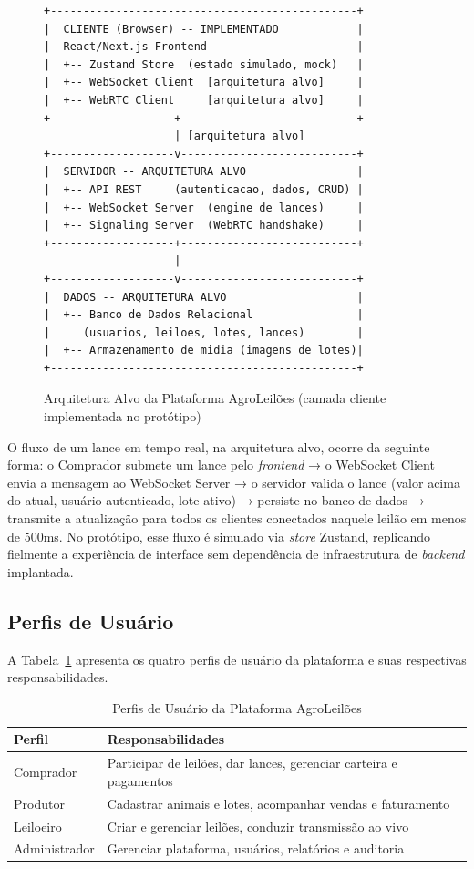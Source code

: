 \documentclass[12pt]{article}
\begin{document}
\begin{figure}[h]
\centering
\begin{lstlisting}
+-----------------------------------------------+
|  CLIENTE (Browser) -- IMPLEMENTADO            |
|  React/Next.js Frontend                       |
|  +-- Zustand Store  (estado simulado, mock)   |
|  +-- WebSocket Client  [arquitetura alvo]     |
|  +-- WebRTC Client     [arquitetura alvo]     |
+-------------------+---------------------------+
                    | [arquitetura alvo]
+-------------------v---------------------------+
|  SERVIDOR -- ARQUITETURA ALVO                 |
|  +-- API REST     (autenticacao, dados, CRUD) |
|  +-- WebSocket Server  (engine de lances)     |
|  +-- Signaling Server  (WebRTC handshake)     |
+-------------------+---------------------------+
                    |
+-------------------v---------------------------+
|  DADOS -- ARQUITETURA ALVO                    |
|  +-- Banco de Dados Relacional                |
|     (usuarios, leiloes, lotes, lances)        |
|  +-- Armazenamento de midia (imagens de lotes)|
+-----------------------------------------------+
\end{lstlisting}
\caption{Arquitetura Alvo da Plataforma AgroLeilões (camada cliente implementada no protótipo)}
\label{fig:arquitetura}
\end{figure}

O fluxo de um lance em tempo real, na arquitetura alvo, ocorre da seguinte forma: o
Comprador submete um lance pelo \textit{frontend} → o WebSocket Client envia a mensagem
ao WebSocket Server → o servidor valida o lance (valor acima do atual, usuário
autenticado, lote ativo) → persiste no banco de dados → transmite a atualização para
todos os clientes conectados naquele leilão em menos de 500ms. No protótipo, esse fluxo
é simulado via \textit{store} Zustand, replicando fielmente a experiência de interface
sem dependência de infraestrutura de \textit{backend} implantada.

\subsection{Perfis de Usuário}

A Tabela~\ref{tab:perfis} apresenta os quatro perfis de usuário da plataforma e suas
respectivas responsabilidades.

\begin{table}[h]
\centering
\caption{Perfis de Usuário da Plataforma AgroLeilões}
\label{tab:perfis}
\begin{tabularx}{\columnwidth}{lX}
\toprule
\textbf{Perfil} & \textbf{Responsabilidades} \\
\midrule
Comprador     & Participar de leilões, dar lances, gerenciar carteira e pagamentos \\
Produtor      & Cadastrar animais e lotes, acompanhar vendas e faturamento \\
Leiloeiro     & Criar e gerenciar leilões, conduzir transmissão ao vivo \\
Administrador & Gerenciar plataforma, usuários, relatórios e auditoria \\
\bottomrule
\end{tabularx}
\end{table}
\end{document}
